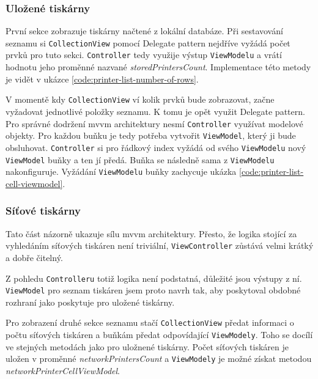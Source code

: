 \subsubsection*{Uložené tiskárny}

První sekce zobrazuje tiskárny načtené z lokální databáze.
Při sestavování seznamu si \texttt{CollectionView} pomocí Delegate pattern nejdříve vyžádá počet prvků pro tuto sekci.
\texttt{Controller} tedy využije výstup \texttt{ViewModelu} a vrátí hodnotu jeho proměnné nazvané \textit{storedPrintersCount}.
Implementace této metody je vidět v ukázce \ref{code:printer-list-number-of-rows}.


V momentě kdy \texttt{CollectionView} ví kolik prvků bude zobrazovat, začne vyžadovat jednotlivé položky seznamu.
K tomu je opět využit Delegate pattern.
Pro správné dodržení \acrshort{mvvm} architektury nesmí \texttt{Controller} využívat modelové objekty.
Pro každou buňku je tedy potřeba vytvořit \texttt{ViewModel}, který ji bude obsluhovat.
\texttt{Controller} si pro řádkový index vyžádá od svého \texttt{ViewModelu} nový \texttt{ViewModel} buňky a ten jí předá.
Buňka se následně sama z \texttt{ViewModelu} nakonfiguruje.
Vyžádání \texttt{ViewModelu} buňky zachycuje ukázka \ref{code:printer-list-cell-viewmodel}.


\subsubsection*{Síťové tiskárny}

Tato část názorně ukazuje sílu \acrshort{mvvm} architektury.
Přesto, že logika stojící za vyhledáním síťových tiskáren není triviální, \texttt{ViewController} zůstává velmi krátký a dobře čitelný.

Z pohledu \texttt{Controlleru} totiž logika není podstatná, důležité jsou výstupy z ní.
\texttt{ViewModel} pro seznam tiskáren jsem proto navrh tak, aby poskytoval obdobné rozhraní jako poskytuje pro uložené tiskárny.

Pro zobrazení druhé sekce seznamu stačí \texttt{CollectionView} předat informaci o počtu síťových tiskáren a buňkám předat odpovídající \texttt{ViewModely}.
Toho se docílí ve stejných metodách jako pro uložnené tiskárny.
Počet síťových tiskáren je uložen v proměnné \textit{networkPrintersCount} a \texttt{ViewModely} je možné získat metodou \textit{networkPrinterCellViewModel}.

